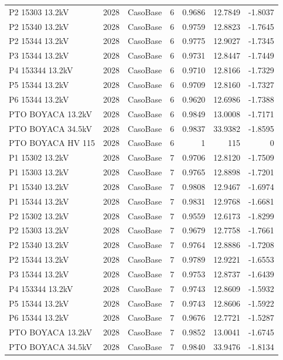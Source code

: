 \documentclass[11pt,a4paper]{article}
\begin{document}
\begin{longtable}{llllrrr}
P2 15303 13.2kV & 2028 & CasoBase & 6 & 0.9686 & 12.7849 & -1.8037 \\
P2 15340 13.2kV & 2028 & CasoBase & 6 & 0.9759 & 12.8823 & -1.7645 \\
P2 15344 13.2kV & 2028 & CasoBase & 6 & 0.9775 & 12.9027 & -1.7345 \\
P3 15344 13.2kV & 2028 & CasoBase & 6 & 0.9731 & 12.8447 & -1.7449 \\
P4 153344 13.2kV & 2028 & CasoBase & 6 & 0.9710 & 12.8166 & -1.7329 \\
P5 15344 13.2kV & 2028 & CasoBase & 6 & 0.9709 & 12.8160 & -1.7327 \\
P6 15344 13.2kV & 2028 & CasoBase & 6 & 0.9620 & 12.6986 & -1.7388 \\
PTO BOYACA 13.2kV & 2028 & CasoBase & 6 & 0.9849 & 13.0008 & -1.7171 \\
PTO BOYACA 34.5kV & 2028 & CasoBase & 6 & 0.9837 & 33.9382 & -1.8595 \\
PTO BOYACA HV 115 & 2028 & CasoBase & 6 & 1 & 115 & 0 \\
P1 15302 13.2kV & 2028 & CasoBase & 7 & 0.9706 & 12.8120 & -1.7509 \\
P1 15303 13.2kV & 2028 & CasoBase & 7 & 0.9765 & 12.8898 & -1.7201 \\
P1 15340 13.2kV & 2028 & CasoBase & 7 & 0.9808 & 12.9467 & -1.6974 \\
P1 15344 13.2kV & 2028 & CasoBase & 7 & 0.9831 & 12.9768 & -1.6681 \\
P2 15302 13.2kV & 2028 & CasoBase & 7 & 0.9559 & 12.6173 & -1.8299 \\
P2 15303 13.2kV & 2028 & CasoBase & 7 & 0.9679 & 12.7758 & -1.7661 \\
P2 15340 13.2kV & 2028 & CasoBase & 7 & 0.9764 & 12.8886 & -1.7208 \\
P2 15344 13.2kV & 2028 & CasoBase & 7 & 0.9789 & 12.9221 & -1.6553 \\
P3 15344 13.2kV & 2028 & CasoBase & 7 & 0.9753 & 12.8737 & -1.6439 \\
P4 153344 13.2kV & 2028 & CasoBase & 7 & 0.9743 & 12.8609 & -1.5932 \\
P5 15344 13.2kV & 2028 & CasoBase & 7 & 0.9743 & 12.8606 & -1.5922 \\
P6 15344 13.2kV & 2028 & CasoBase & 7 & 0.9676 & 12.7721 & -1.5287 \\
PTO BOYACA 13.2kV & 2028 & CasoBase & 7 & 0.9852 & 13.0041 & -1.6745 \\
PTO BOYACA 34.5kV & 2028 & CasoBase & 7 & 0.9840 & 33.9476 & -1.8134 \\

\end{longtable}
\end{document}
